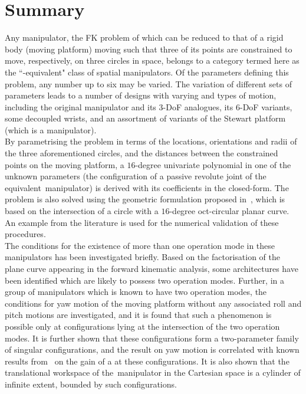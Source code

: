 \documentclass[DD]{iitmdiss}
\newcommand{\mcite}[1]{\cite{#1}}
\begin{document}
\section{Summary}
Any manipulator, the FK problem of which can be reduced to that of a rigid body (moving platform) moving such that three of its points are constrained to move, respectively, on three circles in space, belongs to a category termed here as the ``\rps-equivalent" class of spatial manipulators. Of the parameters defining this problem, any number up to six may be varied. The variation of different sets of parameters leads to a number of designs with varying \dofs and types of motion, including the original \rps manipulator and its 3-DoF analogues, its 6-DoF variants, some decoupled wrists, and an assortment of variants of the Stewart platform (which is a \sps manipulator). \\
By parametrising the problem in terms of the locations, orientations and radii of the three aforementioned circles, and the distances between the constrained points on the moving platform, a $16$-degree univariate polynomial in one of the unknown parameters (the configuration of a passive revolute joint of the equivalent~\rps manipulator) is derived with its coefficients in the closed-form. The problem is also solved using the geometric formulation proposed in~\mcite{tk2017a}, which is based on the intersection of a circle with a $16$-degree oct-circular planar curve. An example from the literature is used for the numerical validation of these procedures.\\
The conditions for the existence of more than one operation mode in these manipulators has been investigated briefly. Based on the factorisation of the plane curve appearing in the forward kinematic analysis, some architectures have been identified which are likely to possess two operation modes. Further, in a group of manipulators which is known to have two operation modes, the conditions for yaw motion of the moving platform without any associated roll and pitch motions are investigated, and it is found that such a phenomenon is possible only at configurations lying at the intersection of the two operation modes. It is further shown that these configurations form a two-parameter family of singular configurations, and the result on yaw motion is correlated with known results from~\mcite{zlatanov2002b} on the gain of a \dof at these configurations. It is also shown that the translational workspace of the~\rps manipulator in the Cartesian space is a cylinder of infinite extent, bounded by such configurations.\\
\end{document}
